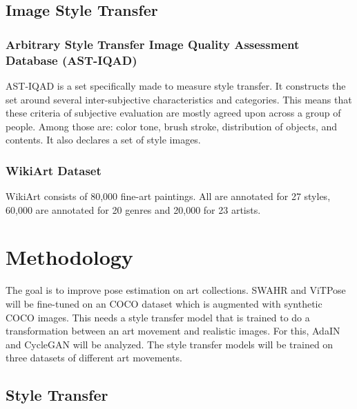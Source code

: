 \documentclass[conference]{IEEEtran}
\begin{document}
\subsection{Image Style Transfer}
\subsubsection{Arbitrary Style Transfer Image Quality Assessment Database (AST-IQAD) \cite{Chen2023}}
AST-IQAD is a set specifically made to measure style transfer.
It constructs the set around several inter-subjective characteristics and categories.
This means that these criteria of subjective evaluation are mostly agreed upon across a group of people.
Among those are: color tone, brush stroke, distribution of objects, and contents.
It also declares a set of style images.

\subsubsection{WikiArt Dataset \cite{Saleh2015}}
WikiArt consists of 80,000 fine-art paintings.
All are annotated for 27 styles, 60,000 are annotated for 20 genres and 20,000 for 23 artists.

\section{Methodology}
The goal is to improve pose estimation on art collections.
SWAHR and ViTPose will be fine-tuned on an COCO dataset which is augmented with synthetic COCO images.
This needs a style transfer model that is trained to do a transformation between an art movement and realistic images.
For this, AdaIN and CycleGAN will be analyzed.
The style transfer models will be trained on three datasets of different art movements.

\subsection{Style Transfer}
\end{document}
